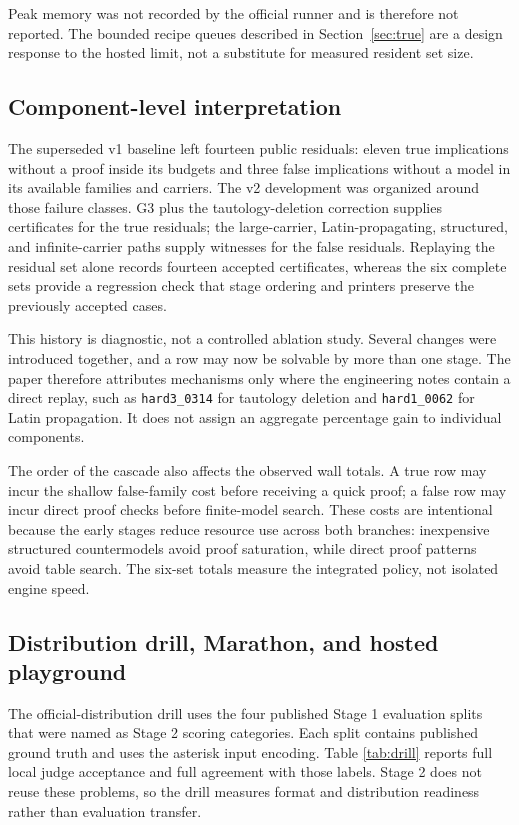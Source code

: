 \documentclass[10pt,twocolumn]{article}
\newcommand{\code}[1]{\texttt{#1}}
\begin{document}
Peak memory was not recorded by the official runner and is therefore not
reported.  The bounded recipe queues described in Section~\ref{sec:true} are a
design response to the hosted limit, not a substitute for measured resident
set size.

\subsection{Component-level interpretation}

The superseded v1 baseline left fourteen public residuals: eleven true
implications without a proof inside its budgets and three false
implications without a model in its available families and carriers.  The v2
development was organized around those failure classes.  G3 plus the
tautology-deletion correction supplies certificates for the true residuals;
the large-carrier, Latin-propagating, structured, and infinite-carrier paths
supply witnesses for the false residuals.  Replaying the residual set alone
records fourteen accepted certificates, whereas the six complete sets provide
a regression check that stage ordering and printers preserve the previously
accepted cases.

This history is diagnostic, not a controlled ablation study.  Several changes
were introduced together, and a row may now be solvable by more than one stage.
The paper therefore attributes mechanisms only where the engineering notes contain
a direct replay, such as \code{hard3\_0314} for tautology deletion and
\code{hard1\_0062} for Latin propagation.  It does not assign an aggregate
percentage gain to individual components.

The order of the cascade also affects the observed wall totals.  A true row
may incur the shallow false-family cost before receiving a quick proof; a false
row may incur direct proof checks before finite-model search.  These costs are
intentional because the early stages reduce resource use across both branches:
inexpensive structured countermodels avoid proof saturation, while direct proof
patterns avoid table search.  The six-set totals measure the integrated policy,
not isolated engine speed.

\subsection{Distribution drill, Marathon, and hosted playground}

The official-distribution drill uses the four published Stage 1 evaluation
splits that were named as Stage 2 scoring categories.  Each split contains
published ground truth and uses the asterisk input encoding.  Table
\ref{tab:drill} reports full local judge acceptance and full agreement with
those labels.  Stage 2 does not reuse these problems, so the drill measures
format and distribution readiness rather than evaluation transfer.
\end{document}
